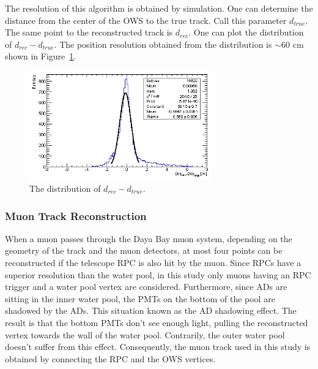 The resolution of this algorithm is obtained by simulation. One can determine the distance from the center of the OWS to the true track. Call this parameter $d_{true}$. The same point to the reconstructed track is $d_{rec}$. One can plot the distribution of $d_{rec}-d_{true}$. The position resolution obtained from the distribution is $\sim$60 cm shown in Figure~\ref{fig:WS_resolution}.
\begin{figure}
	\centering
	\includegraphics[width=0.7\textwidth]{figures/chap5/WS_resolution.eps}
	\caption{The distribution of $d_{rec}-d_{true}$.}
	\label{fig:WS_resolution}
\end{figure}

\subsubsection{Muon Track Reconstruction}
When a muon passes through the Daya Bay muon system, depending on the geometry of the track and the muon detectors, at most four points can be reconstructed if the telescope RPC is also hit by the muon. Since RPCs have a superior resolution than the water pool, in this study only muons having an RPC trigger and a water pool vertex are considered. Furthermore, since ADs are sitting in the inner water pool, the PMTs on the bottom of the pool are shadowed by the ADs. This situation known as the AD shadowing effect. The result is that the bottom PMTs don't see enough light, pulling the reconstructed vertex towards the wall of the water pool. Contrarily, the outer water pool doesn't suffer from this effect. Consequently, the muon track used in this study is obtained by connecting the RPC and the OWS vertices.